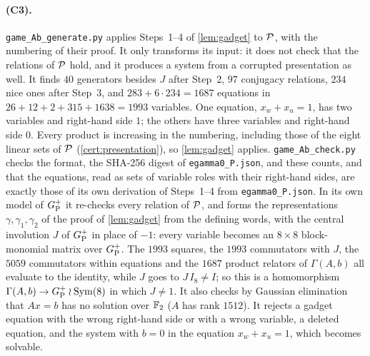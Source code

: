 \paragraph{(C3).} \texttt{game\_Ab\_generate.py} applies Steps~1--4 of \cref{lem:gadget} to $\mathcal P$, with the numbering of their proof. It
only transforms its input: it does not check that the relations of $\mathcal P$ hold, and it produces a system from a corrupted presentation as
well. It finds $40$ generators besides $J$ after Step~2, $97$ conjugacy relations, $234$ nice ones after Step~3, and $283+6\cdot234=1687$ equations in
$26+12+2+315+1638=1993$ variables. One equation, $x_w+x_u=1$, has two variables and right-hand side $1$; the others have three variables and
right-hand side $0$. Every product is increasing in the numbering, including those of the eight linear sets of $\mathcal P$
(\cref{cert:presentation}), so \cref{lem:gadget} applies. \texttt{game\_Ab\_check.py} checks the format, the
SHA-256 digest of \texttt{egamma0\_P.json}, and these counts, and that the equations, read as sets of variable roles with their right-hand
sides, are exactly those of its own derivation of Steps~1--4 from \texttt{egamma0\_P.json}. In its own model of $G_{\mathrm P}^{+}$ it re-checks every
relation of $\mathcal P$, and forms the representations $\gamma,\gamma_1,\gamma_2$ of the proof of \cref{lem:gadget} from the defining words, with
the central involution $J$ of $G_{\mathrm P}^{+}$ in place of $-1$: every variable becomes an $8\times8$ block-monomial matrix over $G_{\mathrm P}^{+}$. The $1993$
squares, the $1993$ commutators with $J$, the $5059$ commutators within equations and the $1687$ product relators of $\Gamma(A,b)$ all
evaluate to the identity, while $J$ goes to $J\,I_8\ne I$; so this is a homomorphism $\Gamma(A,b)\to G_{\mathrm P}^{+}\wr\operatorname{Sym}(8)$ in which $J\ne1$. It also
checks by Gaussian elimination that $Ax=b$ has no solution over $\mathbb F_2$ ($A$ has rank $1512$). It rejects a gadget equation with the wrong
right-hand side or with a wrong variable, a deleted equation, and the system with $b=0$ in the equation $x_w+x_u=1$, which becomes solvable.

